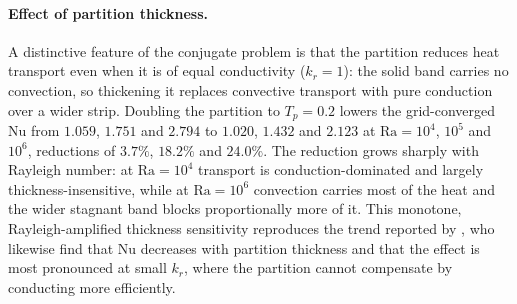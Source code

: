 \paragraph{Effect of partition thickness.}
A distinctive feature of the conjugate problem is that the partition reduces
heat transport even when it is of equal conductivity ($k_r=1$): the solid band
carries no convection, so thickening it replaces convective transport with pure
conduction over a wider strip. Doubling the partition to $T_p=0.2$ lowers the
grid-converged $\mathrm{Nu}$ from $1.059$, $1.751$ and $2.794$ to $1.020$, $1.432$ and
$2.123$ at $\mathrm{Ra}=10^{4}$, $10^{5}$ and $10^{6}$, reductions of $3.7\%$, $18.2\%$
and $24.0\%$. The reduction grows sharply with Rayleigh number: at
$\mathrm{Ra}=10^{4}$ transport is conduction-dominated and largely
thickness-insensitive, while at $\mathrm{Ra}=10^{6}$ convection carries most of the heat
and the wider stagnant band blocks proportionally more of it. This monotone, Rayleigh-amplified
thickness sensitivity reproduces the trend reported by \citet{Khatamifar2021-si},
who likewise find that $\mathrm{Nu}$ decreases with partition thickness and that the
effect is most pronounced at small $k_r$, where the partition cannot compensate
by conducting more efficiently.

